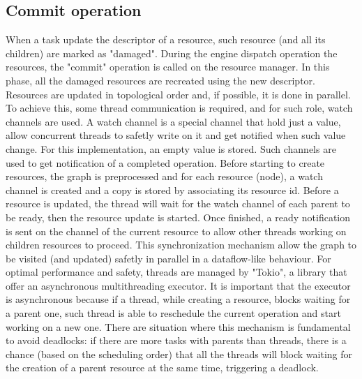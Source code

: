 \subsection{Commit operation}
When a task update the descriptor of a resource, such resource (and all its children) are marked as "damaged". During the engine dispatch operation the resources, the "commit" operation is called on the resource manager. In this phase, all the damaged resources are recreated using the new descriptor. Resources are updated in topological order and, if possible, it is done in parallel. To achieve this, some thread communication is required, and for such role, watch channels are used. A watch channel is a special channel that hold just a value, allow concurrent threads to safetly write on it and get notified when such value change. For this implementation, an empty value is stored. Such channels are used to get notification of a completed operation. Before starting to create resources, the graph is preprocessed and for each resource (node), a watch channel is created and a copy is stored by associating its resource id. Before a resource is updated, the thread will wait for the watch channel of each parent to be ready, then the resource update is started. Once finished, a ready notification is sent on the channel of the current resource to allow other threads working on children resources to proceed. This synchronization mechanism allow the graph to be visited (and updated) safetly in parallel in a dataflow-like behaviour. For optimal performance and safety, threads are managed by "Tokio", a library that offer an asynchronous multithreading executor. It is important that the executor is asynchronous because if a thread, while creating a resource, blocks waiting for a parent one, such thread is able to reschedule the current operation and start working on a new one. There are situation where this mechanism is fundamental to avoid deadlocks: if there are more tasks with parents than threads, there is a chance (based on the scheduling order) that all the threads will block waiting for the creation of a parent resource at the same time, triggering a deadlock. 


\newpage
